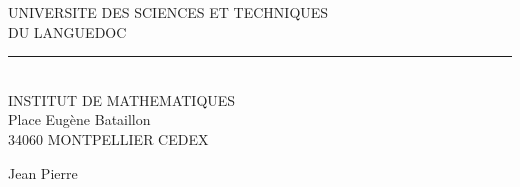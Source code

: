 \begin{center}
UNIVERSITE DES SCIENCES ET TECHNIQUES\\
DU LANGUEDOC\\
\rule{0.7cm}{0.2pt}\\
INSTITUT DE MATHEMATIQUES\\
Place Eugène Bataillon\\
34060 MONTPELLIER CEDEX
\end{center}

Jean Pierre 
